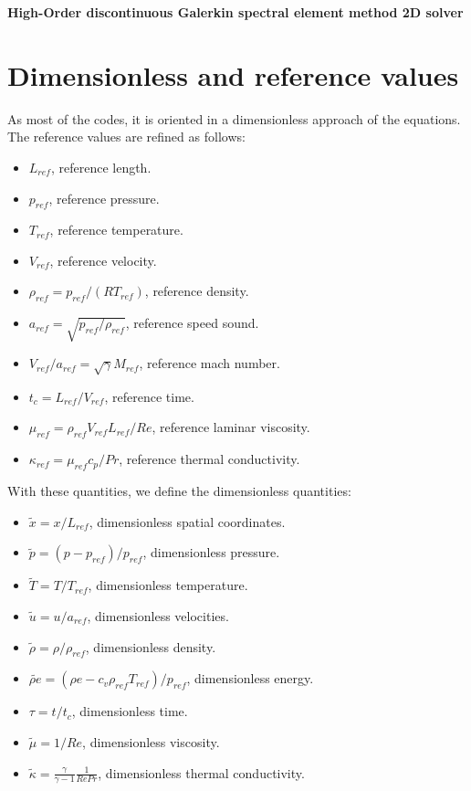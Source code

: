 \documentclass[10pt,a4paper]{article}
\begin{document}
\begin{center}
	\textbf{High-Order discontinuous Galerkin spectral element method 2D solver}\\
	\hrulefill
	\tableofcontents
	\hrulefill
\end{center}

\section{Dimensionless and reference values}

As most of the codes, it is oriented in a dimensionless approach of the equations. The reference values are refined as follows:

\begin{itemize}
	\item $L_{ref}$, reference length.
	\item $p_{ref}$, reference pressure.
	\item $T_{ref}$, reference temperature.
	\item $V_{ref}$, reference velocity. 
	\item $\rho_{ref} = p_{ref} / (RT_{ref})$, reference density.
	\item $a_{ref} = \sqrt{p_{ref} / \rho_{ref}}$, reference speed sound.
	\item $V_{ref}/a_{ref}=\sqrt{\gamma}M_{ref}$, reference mach number.
	\item $t_c = L_{ref} / V_{ref}$, reference time.
	\item $\mu_{ref} = \rho_{ref} V_{ref} L_{ref} / Re$, reference laminar viscosity.
	\item $\kappa_{ref} = \mu_{ref} c_p / Pr$, reference thermal conductivity.
\end{itemize}

With these quantities, we define the dimensionless quantities:

\begin{itemize}
	\item $\tilde{x} = x / L_{ref}$, dimensionless spatial coordinates.
	\item $\tilde{p} = (p-p_{ref}) / p_{ref}$, dimensionless pressure.
	\item $\tilde{T} = T / T_{ref}$, dimensionless temperature.
	\item $\tilde{u} = u / a_{ref}$, dimensionless velocities.
	\item $\tilde{\rho} = \rho / \rho_{ref}$, dimensionless density.
	\item $\tilde{\rho e} = (\rho e-c_v\rho_{ref}T_{ref})/ p_{ref}$, dimensionless energy.
	\item $\tau = t / t_c$, dimensionless time.
	\item $\tilde{\mu} = 1/Re$, dimensionless viscosity.
	\item $\tilde{\kappa} = \frac{\gamma}{\gamma-1}\frac{1}{RePr}$, dimensionless thermal conductivity.
\end{itemize}
\end{document}
